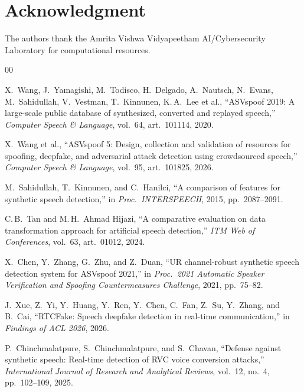 \documentclass[conference]{IEEEtran}
\begin{document}
\section*{Acknowledgment}

The authors thank the Amrita Vishwa Vidyapeetham AI/Cybersecurity Laboratory for computational resources.

\begin{thebibliography}{00}

X.\ Wang, J.\ Yamagishi, M.\ Todisco, H.\ Delgado, A.\ Nautsch, N.\ Evans, M.\ Sahidullah, V.\ Vestman, T.\ Kinnunen, K.\,A.\ Lee et al., ``ASVspoof 2019: A large-scale public database of synthesized, converted and replayed speech,'' \textit{Computer Speech \& Language}, vol.~64, art.~101114, 2020.

X.\ Wang et al., ``ASVspoof 5: Design, collection and validation of resources for spoofing, deepfake, and adversarial attack detection using crowdsourced speech,'' \textit{Computer Speech \& Language}, vol.~95, art.~101825, 2026.

M.\ Sahidullah, T.\ Kinnunen, and C.\ Hanilci, ``A comparison of features for synthetic speech detection,'' in \textit{Proc.\ INTERSPEECH}, 2015, pp.\ 2087--2091.

C.\,B.\ Tan and M.\,H.\ Ahmad Hijazi, ``A comparative evaluation on data transformation approach for artificial speech detection,'' \textit{ITM Web of Conferences}, vol.~63, art.~01012, 2024.

X.\ Chen, Y.\ Zhang, G.\ Zhu, and Z.\ Duan, ``UR channel-robust synthetic speech detection system for ASVspoof 2021,'' in \textit{Proc.\ 2021 Automatic Speaker Verification and Spoofing Countermeasures Challenge}, 2021, pp.\ 75--82.

J.\ Xue, Z.\ Yi, Y.\ Huang, Y.\ Ren, Y.\ Chen, C.\ Fan, Z.\ Su, Y.\ Zhang, and B.\ Cai, ``RTCFake: Speech deepfake detection in real-time communication,'' in \textit{Findings of ACL 2026}, 2026.

P.\ Chinchmalatpure, S.\ Chinchmalatpure, and S.\ Chavan, ``Defense against synthetic speech: Real-time detection of RVC voice conversion attacks,'' \textit{International Journal of Research and Analytical Reviews}, vol.~12, no.~4, pp.\ 102--109, 2025.


\end{thebibliography}
\end{document}
